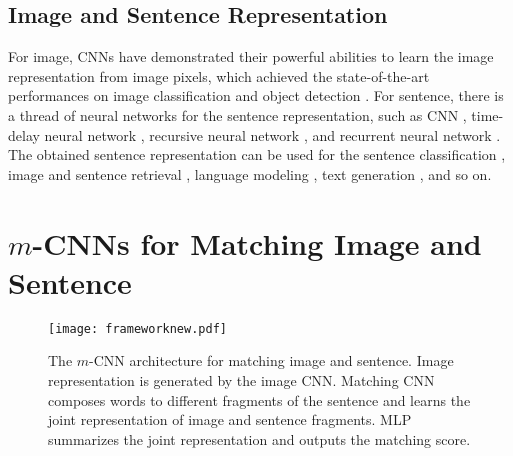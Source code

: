 \documentclass[10pt,twocolumn,letterpaper]{article}
\begin{document}
\subsection{Image and Sentence Representation}
For image, CNNs have demonstrated their powerful abilities to learn the image representation from image pixels, which achieved the state-of-the-art performances on image classification \cite{he_eccv2014,simonyan_arxiv2014,szegedy_arxiv2014,he_arxiv2015} and object detection \cite{ouyang_arxiv14, girshick_cvpr2014}. For sentence, there is a thread of neural networks for the sentence representation, such as CNN \cite{kalchbrenner_acl2014,ykim_emnlp2014}, time-delay neural network \cite{collobert_jmlr2011}, recursive neural network \cite{irsoy_nips2014}, and recurrent neural network \cite{blunsom_arxiv2013,socher_tacl2014,mao_2014,sutskever_icml2011}. The obtained sentence representation can be used for the sentence classification \cite{ykim_emnlp2014}, image and sentence retrieval \cite{socher_tacl2014,mao_2014}, language modeling \cite{collobert_jmlr2011}, text generation \cite{karpathy_dvsa_2014,sutskever_icml2011}, and so on.












\section{${m}$-CNNs for Matching Image and Sentence}
\label{sec_model}


\begin{figure}[t!]
\begin{center}
   \texttt{[image: frameworknew.pdf]}

\end{center}
   \caption{The $m$-CNN architecture for matching image and sentence. Image representation is generated by the image CNN. Matching CNN composes words to different fragments of the sentence and learns the joint representation of image and sentence fragments. MLP summarizes the joint representation and outputs the matching score.}
\label{fig:framework}
\end{figure}
\end{document}
